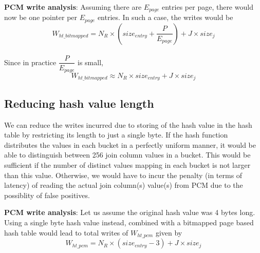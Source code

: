 \textbf{PCM write analysis}: Assuming there are $E_{page}$ entries per page, there would now be one pointer per $E_{page}$ entries. In such a case, the writes would be 
$$W_{ht\_bitmapped} = N_R \times (size_{entry} + \frac{P}{E_{page}}) + J \times size_{j}$$\\
Since in practice $\dfrac{P}{E_{page}}$ is small, 
\begin{equation}\label{eq:ht_bmp}
 W_{ht\_bitmapped} \approx N_R \times size_{entry} + J \times size_{j} 
\end{equation} 


\subsection{Reducing hash value length}
We can reduce the writes incurred due to storing of the hash value in the hash table by restricting its length to just a single byte. If the hash function distributes the values in each bucket in a perfectly uniform manner, it would be able to distinguish between 256 join column values in a bucket. This would be sufficient if the number of distinct values mapping in each bucket is not larger than this value. Otherwise, we would have to incur the penalty (in terms of latency) of reading the actual join column(s) value(s) from PCM due to the possiblity of false positives.

\textbf{PCM write analysis}: Let us assume the original hash value was 4 bytes long. Using a single byte hash value instead, combined with a bitmapped page based hash table would lead to total writes of $W_{ht\_pcm}$ given by
\begin{equation}\label{eq:ht_pcm}
W_{ht\_pcm} = N_R \times (size_{entry} - 3)+ J \times size_{j}
\end{equation}
	

